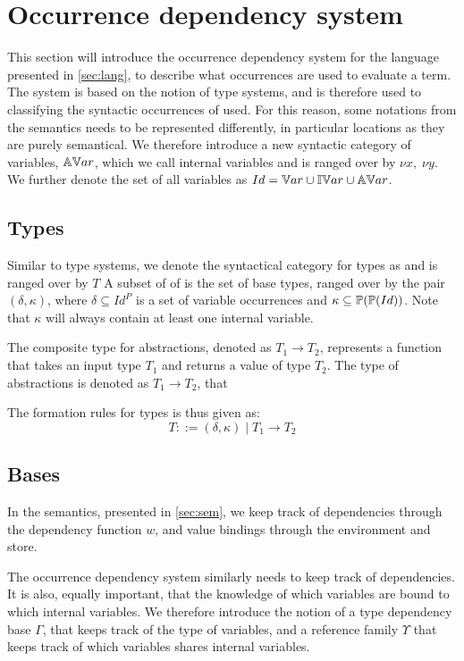 \documentclass[../../master.tex]{subfiles}
\begin{document}
\section{Occurrence dependency system}
This section will introduce the occurrence dependency system for the language presented in \cref{sec:lang}, to describe what occurrences are used to evaluate a term.
The system is based on the notion of type systems, and is therefore used to classifying the syntactic occurrences of used.
For this reason, some notations from the semantics needs to be represented differently, in particular locations as they are purely semantical.
We therefore introduce a new syntactic category of variables, $\mathbb{AV}ar$, which we call internal variables and is ranged over by $\nu x,\;\nu y$.
We further denote the set of all variables as $Id=\mathbb{V}ar\cup\mathbb{IV}ar\cup\mathbb{AV}ar$.

\subsection{Types}
Similar to type systems, we denote the syntactical category for types as  and is ranged over by $T$
A subset of of  is the set of base types, ranged over by the pair $(\delta,\kappa)$, where $\delta\subseteq Id^P$ is a set of variable occurrences and $\kappa\subseteq\mathbb{P}(\mathbb{P}(Id))$.
Note that $\kappa$ will always contain at least one internal variable.

The composite type for abstractions, denoted as $T_1\rightarrow T_2$, represents a function that takes an input type $T_1$ and returns a value of type $T_2$.
The type of abstractions is denoted as $T_1\rightarrow T_2$, that 

The formation rules for types is thus given as:
$$T::=(\delta,\kappa)\mid T_1 \rightarrow T_2$$

\subsection{Bases}
In the semantics, presented in \cref{sec:sem}, we keep track of dependencies through the dependency function $w$, and value bindings through the environment and store.

The occurrence dependency system similarly needs to keep track of dependencies.
It is also, equally important, that the knowledge of which variables are bound to which internal variables.
We therefore introduce the notion of a type dependency base $\Gamma$, that keeps track of the type of variables, and a reference family $\Upsilon$ that keeps track of which variables shares internal variables.
\end{document}
